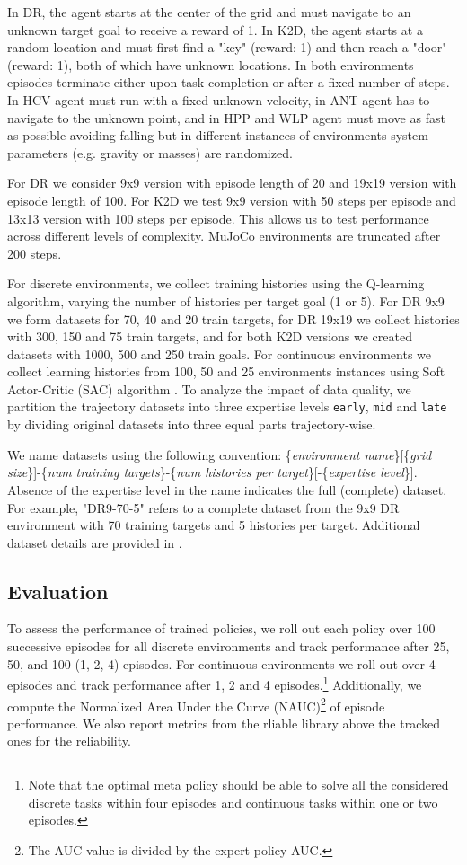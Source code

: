 \documentclass{article} %
\begin{document}
In DR, the agent starts at the center of the grid and must navigate to an unknown target goal to receive a reward of 1. In K2D, the agent starts at a random location and must first find a "key" (reward: 1) and then reach a "door" (reward: 1), both of which have unknown locations. In both environments episodes terminate either upon task completion or after a fixed number of steps. In HCV agent must run with a fixed unknown velocity, in ANT agent has to navigate to the unknown point, and in HPP and WLP agent must move as fast as possible avoiding falling but in different instances of environments system parameters (e.g. gravity or masses) are randomized.

For DR we consider 9x9 version with episode length of 20 and 19x19 version with episode length of 100.  For K2D we test 9x9 version with 50 steps per episode and 13x13 version with 100 steps per episode. This allows us to test performance across different levels of complexity. MuJoCo environments are truncated after 200 steps.

For discrete environments, we collect training histories using the Q-learning \citep{watkins1992q} algorithm, varying the number of histories per target goal (1 or 5). For DR 9x9 we form datasets for 70, 40 and 20 train targets, for DR 19x19 we collect histories with 300, 150 and 75 train targets, and for both K2D versions we created datasets with 1000, 500 and 250 train goals. For continuous environments we collect learning histories from 100, 50 and 25 environments instances using Soft Actor-Critic (SAC) algorithm \citep{haarnoja2018soft}.
To analyze the impact of data quality, we partition the trajectory datasets into three expertise levels \texttt{early}, \texttt{mid} and \texttt{late} by dividing original datasets into three equal parts trajectory-wise.

We name datasets using the following convention:
\{\textit{environment name}\}[\{\textit{grid size}\}]-\{\textit{num training targets}\}-\{\textit{num histories per target}\}[-\{\textit{expertise level}\}]. Absence of the expertise level in the name indicates the full (complete) dataset. For example, "DR9-70-5" refers to a complete dataset from the 9x9 DR environment with 70 training targets and 5 histories per target. Additional dataset details are provided in .

\subsection{Evaluation}
\label{sub:eval}
To assess the performance of trained policies, we roll out each policy over 100 successive episodes for all discrete environments and track performance after 25, 50, and 100 (1, 2, 4) episodes. For continuous environments we roll out over 4 episodes and track performance after 1, 2 and 4 episodes.\footnote{Note that the optimal meta policy should be able to solve all the considered discrete tasks within four episodes and continuous tasks within one or two episodes.} Additionally, we compute the Normalized Area Under the Curve (NAUC)\footnote{The AUC value is divided by the expert policy AUC.} of episode performance. We also report metrics from the rliable library \citep{agarwal2021deep} above the tracked ones for the reliability.
\end{document}
